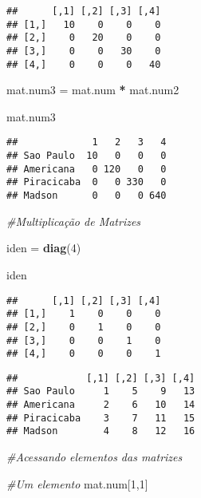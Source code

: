\documentclass[]{article}
\newenvironment{Shaded}{\begin{snugshade}}{\end{snugshade}}
\newcommand{\KeywordTok}[1]{\textcolor[rgb]{0.13,0.29,0.53}{\textbf{#1}}}
\newcommand{\DecValTok}[1]{\textcolor[rgb]{0.00,0.00,0.81}{#1}}
\newcommand{\StringTok}[1]{\textcolor[rgb]{0.31,0.60,0.02}{#1}}
\newcommand{\CommentTok}[1]{\textcolor[rgb]{0.56,0.35,0.01}{\textit{#1}}}
\newcommand{\OperatorTok}[1]{\textcolor[rgb]{0.81,0.36,0.00}{\textbf{#1}}}
\newcommand{\NormalTok}[1]{#1}
\begin{document}
\begin{verbatim}
##      [,1] [,2] [,3] [,4]
## [1,]   10    0    0    0
## [2,]    0   20    0    0
## [3,]    0    0   30    0
## [4,]    0    0    0   40
\end{verbatim}

\begin{Shaded}
\begin{Highlighting}[]
\NormalTok{mat.num3 =}\StringTok{ }\NormalTok{mat.num }\OperatorTok{*}\StringTok{ }\NormalTok{mat.num2}

\NormalTok{mat.num3}
\end{Highlighting}
\end{Shaded}

\begin{verbatim}
##             1   2   3   4
## Sao Paulo  10   0   0   0
## Americana   0 120   0   0
## Piracicaba  0   0 330   0
## Madson      0   0   0 640
\end{verbatim}

\begin{Shaded}
\begin{Highlighting}[]
\CommentTok{#Multiplicação de Matrizes}

\NormalTok{iden =}\StringTok{ }\KeywordTok{diag}\NormalTok{(}\DecValTok{4}\NormalTok{)}

\NormalTok{iden}
\end{Highlighting}
\end{Shaded}

\begin{verbatim}
##      [,1] [,2] [,3] [,4]
## [1,]    1    0    0    0
## [2,]    0    1    0    0
## [3,]    0    0    1    0
## [4,]    0    0    0    1
\end{verbatim}

\begin{Shaded}
\end{Shaded}

\begin{verbatim}
##            [,1] [,2] [,3] [,4]
## Sao Paulo     1    5    9   13
## Americana     2    6   10   14
## Piracicaba    3    7   11   15
## Madson        4    8   12   16
\end{verbatim}

\begin{Shaded}
\begin{Highlighting}[]
\CommentTok{#Acessando elementos das matrizes }

\CommentTok{#Um elemento}
\NormalTok{mat.num[}\DecValTok{1}\NormalTok{,}\DecValTok{1}\NormalTok{]}
\end{Highlighting}
\end{Shaded}
\end{document}
